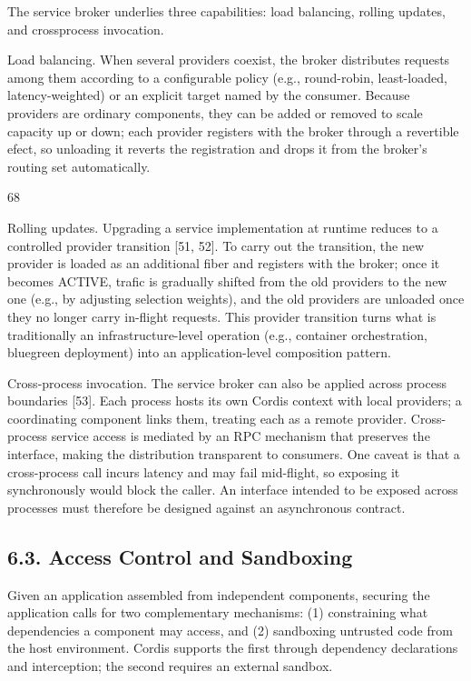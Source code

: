 \documentclass[
  10
]{article}
\begin{document}
The service broker underlies three capabilities: load balancing, rolling
updates, and crossprocess invocation.

Load balancing. When several providers coexist, the broker distributes
requests among them according to a configurable policy (e.g.,
round-robin, least-loaded, latency-weighted) or an explicit target named
by the consumer. Because providers are ordinary components, they can be
added or removed to scale capacity up or down; each provider registers
with the broker through a revertible efect, so unloading it reverts the
registration and drops it from the broker's routing set automatically.

68

Rolling updates. Upgrading a service implementation at runtime reduces
to a controlled provider transition {[}51, 52{]}. To carry out the
transition, the new provider is loaded as an additional fiber and
registers with the broker; once it becomes ACTIVE, trafic is gradually
shifted from the old providers to the new one (e.g., by adjusting
selection weights), and the old providers are unloaded once they no
longer carry in-flight requests. This provider transition turns what is
traditionally an infrastructure-level operation (e.g., container
orchestration, bluegreen deployment) into an application-level
composition pattern.

Cross-process invocation. The service broker can also be applied across
process boundaries {[}53{]}. Each process hosts its own Cordis context
with local providers; a coordinating component links them, treating each
as a remote provider. Cross-process service access is mediated by an RPC
mechanism that preserves the interface, making the distribution
transparent to consumers. One caveat is that a cross-process call incurs
latency and may fail mid-flight, so exposing it synchronously would
block the caller. An interface intended to be exposed across processes
must therefore be designed against an asynchronous contract.

\subsection{6.3. Access Control and
Sandboxing}\label{access-control-and-sandboxing}

Given an application assembled from independent components, securing the
application calls for two complementary mechanisms: (1) constraining
what dependencies a component may access, and (2) sandboxing untrusted
code from the host environment. Cordis supports the first through
dependency declarations and interception; the second requires an
external sandbox.
\end{document}
